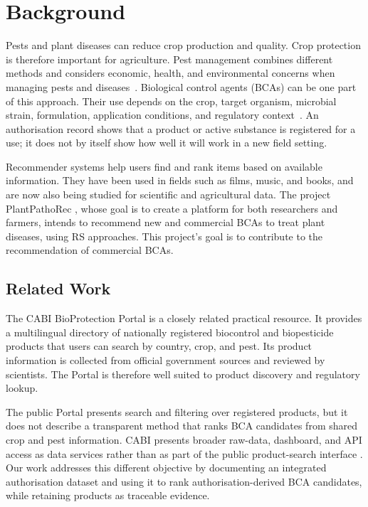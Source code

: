 \section{Background}\label{sec:background-and-context}

Pests and plant diseases can reduce crop production and quality. Crop protection is therefore important for agriculture. Pest management combines different methods and considers economic, health, and environmental concerns when managing pests and diseases~\cite{fao-ipm}.
Biological control agents (BCAs) can be one part of this approach. Their use depends on the crop, target organism, microbial strain, formulation, application conditions, and regulatory context~\cite{fao-ipm,plantpathorec-project}. An authorisation record shows that a product or active substance is registered for a use; it does not by itself show how well it will work in a new field setting.

Recommender systems help users find and rank items based on available information. They have been used in fields such as films, music, and books, and are now also being studied for scientific and agricultural data.
The project PlantPathoRec \cite{plantpathorec-project}, whose goal is to create a platform for both researchers and farmers, intends to recommend new and commercial BCAs to treat plant diseases, using RS approaches.
This project's goal is to contribute to the recommendation of commercial BCAs.

\subsection{Related Work}

The CABI BioProtection Portal \cite{cabi-bioprotection-portal} is a closely related practical resource.
It provides a multilingual directory of nationally registered biocontrol and biopesticide products that users can search by country, crop, and pest.
Its product information is collected from official government sources and reviewed by scientists.
The Portal is therefore well suited to product discovery and regulatory lookup.

The public Portal presents search and filtering over registered products, but it does not describe a transparent method that ranks BCA candidates from shared crop and pest information.
CABI presents broader raw-data, dashboard, and API access as data services rather than as part of the public product-search interface \cite{cabi-bioprotection-data}.
Our work addresses this different objective by documenting an integrated authorisation dataset and using it to rank authorisation-derived BCA candidates, while retaining products as traceable evidence.
